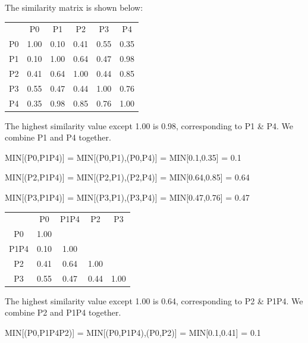 \documentclass{article}
\begin{document}
The similarity matrix is shown below:

\begin{center}
\begin{tabular}{ c c c c c c}

 & P0 & P1 & P2 & P3 & P4 \\

P0 & 1.00 & 0.10 & 0.41 & 0.55 & 0.35 \\

P1 & 0.10 & 1.00 & 0.64 & 0.47 & 0.98 \\
 
P2 & 0.41 & 0.64 & 1.00 & 0.44 & 0.85 \\ 
 
P3 & 0.55 & 0.47 & 0.44 & 1.00 & 0.76 \\
 
P4 & 0.35 & 0.98 & 0.85 & 0.76 & 1.00

\end{tabular}
\end{center}

The highest similarity value except 1.00 is 0.98, corresponding to P1 \& P4. We combine P1 and P4 together.

MIN[(P0,P1P4)] = MIN[(P0,P1),(P0,P4)] = MIN[0.1,0.35] = 0.1

MIN[(P2,P1P4)] = MIN[(P2,P1),(P2,P4)] = MIN[0.64,0.85] = 0.64

MIN[(P3,P1P4)] = MIN[(P3,P1),(P3,P4)] = MIN[0.47,0.76] = 0.47

\begin{center}
\begin{tabular}{ c c c c c}

 & P0 & P1P4 & P2 & P3 \\

P0 & 1.00 &  &  &  \\

P1P4 & 0.10 & 1.00 &  &  \\
 
P2 & 0.41 & 0.64 & 1.00 &  \\ 
 
P3 & 0.55 & 0.47 & 0.44 & 1.00 \\

\end{tabular}
\end{center}

The highest similarity value except 1.00 is 0.64, corresponding to P2 \& P1P4. We combine P2 and P1P4 together.

MIN[(P0,P1P4P2)] = MIN[(P0,P1P4),(P0,P2)] = MIN[0.1,0.41] = 0.1
\end{document}
